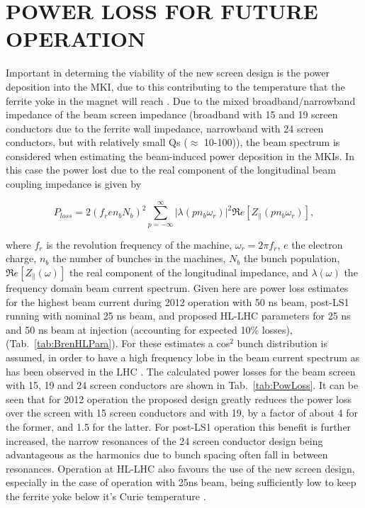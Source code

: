 \documentclass{JAC2003}
\begin{document}
\section{POWER LOSS FOR FUTURE OPERATION}

Important in determing the viability of the new screen design is the power deposition into the MKI, due to this contributing to the temperature that the ferrite yoke in the magnet will reach \cite{mki-heatingTemp}. Due to the mixed broadband/narrowband impedance of the beam screen impedance (broadband with 15 and 19 screen conductors due to the ferrite wall impedance, narrowband with 24 screen conductors, but with relatively small Qs ($\approx$ 10-100)), the beam spectrum is considered when estimating the beam-induced power deposition in the MKIs. In this case the power lost due to the real component of the longitudinal beam coupling impedance is given by~\cite{metral_cham2012} 

\begin{equation}
P_{loss} = 2 \left( f_{r} e n_{b}  N_{b}\right)^{2} \displaystyle\sum\limits_{p = -\infty}^{\infty}  \left| \lambda \left( p n_{b} \omega_{r} \right)  \right|^{2} \Re{}e \left[ Z_{\parallel} \left( p n_{b}\omega_{r} \right) \right],
\label{eqn:heating-gen}
\end{equation} 

where $f_{r}$ is the revolution frequency of the machine, $\omega_{r}=2\pi f_{r}$, $e$ the electron charge, $n_{b}$ the number of bunches in the machines, $N_{b}$ the bunch population, $\Re{}e[Z_{\parallel}(\omega )]$ the real component of the longitudinal impedance, and $\lambda (\omega )$ the frequency domain beam current spectrum. Given here are power loss estimates for the highest beam current during 2012 operation with 50 ns beam, post-LS1 running with nominal 25 ns beam, and proposed HL-LHC parameters for 25 ns and 50 ns beam at injection (accounting for expected 10\% losses), (Tab.~\ref{tab:BrenHLPara}). For these estimates a cos$^{2}$ bunch distribution is assumed, in order to have a high frequency lobe in the beam current spectrum as has been observed in the LHC \cite{LHCRF}. The calculated power losses for the beam screen with 15, 19 and 24 screen conductors are shown in Tab.~\ref{tab:PowLoss}. It can be seen that for 2012 operation the proposed design greatly reduces the power loss over the screen with 15 screen conductors and with 19, by a factor of about 4 for the former, and 1.5 for the latter. For post-LS1 operation this benefit is further increased, the narrow resonances of the 24 screen conductor design being advantageous as the harmonics due to bunch spacing often fall in between resonances. Operation at HL-LHC also favours the use of the new screen design, especially in the case of operation with 25ns beam, being sufficiently low to keep the ferrite yoke below it's Curie temperature \cite{mki-heatingTemp}.
\end{document}
